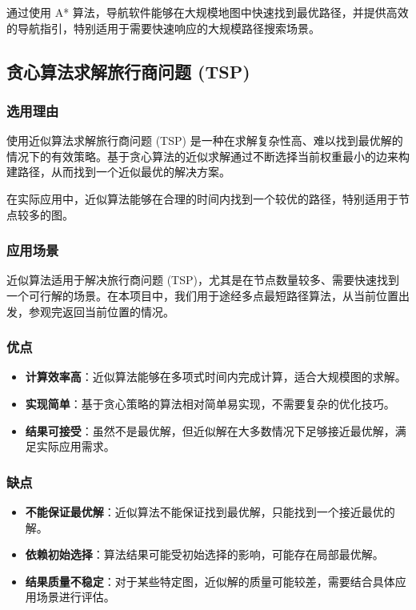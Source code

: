 \documentclass{ctexart}
\begin{document}
通过使用 A* 算法，导航软件能够在大规模地图中快速找到最优路径，并提供高效的导航指引，特别适用于需要快速响应的大规模路径搜索场景。

\subsection{贪心算法求解旅行商问题 (TSP)}

\subsubsection{选用理由}

使用近似算法求解旅行商问题 (TSP) 是一种在求解复杂性高、难以找到最优解的情况下的有效策略。基于贪心算法的近似求解通过不断选择当前权重最小的边来构建路径，从而找到一个近似最优的解决方案。

在实际应用中，近似算法能够在合理的时间内找到一个较优的路径，特别适用于节点较多的图。

\subsubsection{应用场景}

近似算法适用于解决旅行商问题 (TSP)，尤其是在节点数量较多、需要快速找到一个可行解的场景。在本项目中，我们用于途经多点最短路径算法，从当前位置出发，参观完返回当前位置的情况。

\subsubsection{优点}

\begin{itemize}
    \item \textbf{计算效率高}：近似算法能够在多项式时间内完成计算，适合大规模图的求解。
    \item \textbf{实现简单}：基于贪心策略的算法相对简单易实现，不需要复杂的优化技巧。
    \item \textbf{结果可接受}：虽然不是最优解，但近似解在大多数情况下足够接近最优解，满足实际应用需求。
\end{itemize}

\subsubsection{缺点}

\begin{itemize}
    \item \textbf{不能保证最优解}：近似算法不能保证找到最优解，只能找到一个接近最优的解。
    \item \textbf{依赖初始选择}：算法结果可能受初始选择的影响，可能存在局部最优解。
    \item \textbf{结果质量不稳定}：对于某些特定图，近似解的质量可能较差，需要结合具体应用场景进行评估。
\end{itemize}
\end{document}
